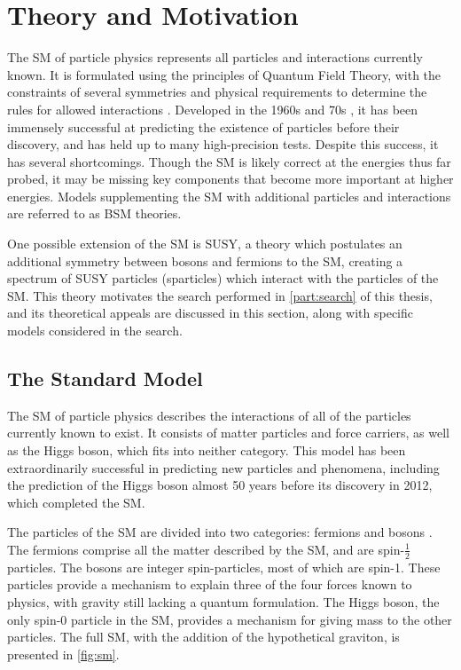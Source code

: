 
\chapter{Theory and Motivation} %

\label{ch:theory} %
The \acf{SM} of particle physics represents all particles and interactions currently known. It is formulated using the principles of Quantum Field Theory, with the constraints of several symmetries and physical requirements to determine the rules for allowed interactions \cite{Burgess:2007zi}. Developed in the 1960s and 70s \cite{Glashow:1961tr, PhysRev.127.331, PhysRevLett.19.1264}, it has been immensely successful at predicting the existence of particles before their discovery, and has held up to many high-precision tests. Despite this success, it has several shortcomings. Though the \ac{SM} is likely correct at the energies thus far probed, it may be missing key components that become more important at higher energies. Models supplementing the \ac{SM} with additional particles and interactions are referred to as \ac{BSM} theories. 

One possible extension of the \ac{SM} is \ac{SUSY}, a theory which postulates an additional symmetry between bosons and fermions to the \ac{SM}, creating a spectrum of \ac{SUSY} particles (sparticles) which interact with the particles of the \ac{SM}. This theory motivates the search performed in \autoref{part:search} of this thesis, and its theoretical appeals are discussed in this section, along with specific models considered in the search. 


\section{The Standard Model}
\label{sec:standard_model}
The \ac{SM} of particle physics describes the interactions of all of the particles currently known to exist. It consists of matter particles and force carriers, as well as the Higgs boson, which fits into neither category. This model has been extraordinarily successful in predicting new particles and phenomena, including the prediction of the Higgs boson almost 50 years before its discovery in 2012, which completed the \ac{SM}.  

The particles of the \ac{SM} are divided into two categories: fermions and bosons \cite{Burgess:2007zi}. The fermions comprise all the matter described by the \ac{SM}, and are spin-$\frac{1}{2}$ particles. The bosons are integer spin-particles, most of which are spin-1. These particles provide a mechanism to explain three of the four forces known to physics, with gravity still lacking a quantum formulation. The Higgs boson, the only spin-0 particle in the \ac{SM}, provides a mechanism for giving mass to the other particles. The full \ac{SM}, with the addition of the hypothetical graviton, is presented in \autoref{fig:sm}. 

